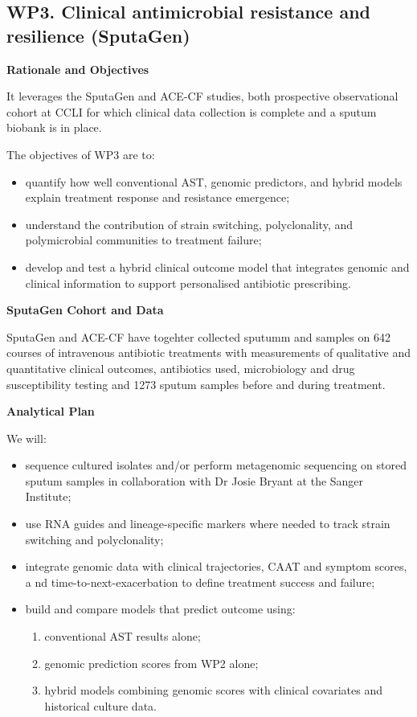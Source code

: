 \subsection*{WP3. Clinical antimicrobial resistance and resilience (SputaGen)}

\textbf{Rationale and Objectives}



It leverages the SputaGen and ACE-CF studies, both prospective observational cohort at CCLI for which clinical data 
collection is complete and a sputum biobank is in place.

The objectives of WP3 are to:

\begin{itemize}
  \item quantify how well conventional AST, genomic predictors, and hybrid models explain treatment response and resistance emergence;
  \item understand the contribution of strain switching, polyclonality, and polymicrobial communities to treatment failure;
  \item develop and test a hybrid clinical outcome model that integrates genomic and 
  clinical information to support personalised antibiotic prescribing.
\end{itemize}

\textbf{SputaGen Cohort and Data}

SputaGen and ACE-CF have togehter collected sputumm and samples on 642 courses of intravenous antibiotic treatments with 
measurements of qualitative and quantitative clinical outcomes, antibiotics used, microbiology and drug susceptibility testing 
and 1273 sputum samples before and during treatment. 

\textbf{Analytical Plan}

We will:

\begin{itemize}
  \item sequence cultured isolates and/or perform metagenomic sequencing on stored sputum samples 
  in collaboration with Dr Josie Bryant at the Sanger Institute;
  \item use RNA guides and lineage-specific markers where needed to track strain switching and polyclonality;
  \item integrate genomic data with clinical trajectories, CAAT and symptom scores, a
  nd time-to-next-exacerbation to define treatment success and failure;
  \item build and compare models that predict outcome using:
        \begin{enumerate}
          \item conventional AST results alone;
          \item genomic prediction scores from WP2 alone;
          \item hybrid models combining genomic scores with clinical covariates and historical culture data.
        \end{enumerate}
\end{itemize}

